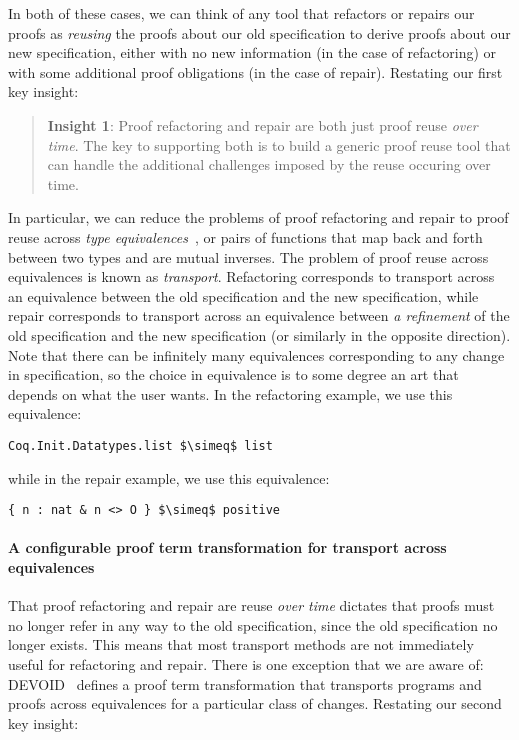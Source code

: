 In both of these cases, we can think of any tool that refactors or repairs our proofs as
\textit{reusing} the proofs about our old specification to derive proofs about our new specification,
either with no new information (in the case of refactoring) or with some additional proof obligations (in the case of repair).
Restating our first key insight:

\begin{quote}
\textbf{Insight 1}:
Proof refactoring and repair are both just 
proof reuse %
\textit{over time}. The key to supporting both is to build a generic proof reuse
tool that can handle the additional challenges imposed by the reuse occuring over time. 
\end{quote}
In particular, we can reduce the problems of proof refactoring and repair to proof reuse across \textit{type equivalences}~\cite{univalent2013homotopy},
or pairs of functions that map back and forth between two types and are mutual inverses.
The problem of proof reuse across equivalences is known as \textit{transport}. %
Refactoring corresponds to transport across an equivalence between the old specification and the new specification,
while repair corresponds to transport across an equivalence between \textit{a refinement} of the old specification
and the new specification (or similarly in the opposite direction).
Note that there can be infinitely many equivalences corresponding to any change in specification,
so the choice in equivalence is to some degree an art that depends on what the user wants.
In the refactoring example, we use this equivalence:

\begin{lstlisting}
Coq.Init.Datatypes.list $\simeq$ list
\end{lstlisting}
while in the repair example, we use this equivalence:

\begin{lstlisting}
{ n : nat & n <> O } $\simeq$ positive
\end{lstlisting}

\paragraph{A configurable proof term transformation for transport across equivalences}

That proof refactoring and repair are reuse \textit{over time} dictates that proofs
must no longer refer in any way to the old specification, since the old specification no longer exists.
This means that most transport methods %
are not immediately useful for refactoring and repair.
There is one exception that we are aware of: \textsc{DEVOID}~\cite{Ringer2019} defines a proof term transformation
that transports programs and proofs across equivalences for a particular class of changes.
Restating our second key insight:

